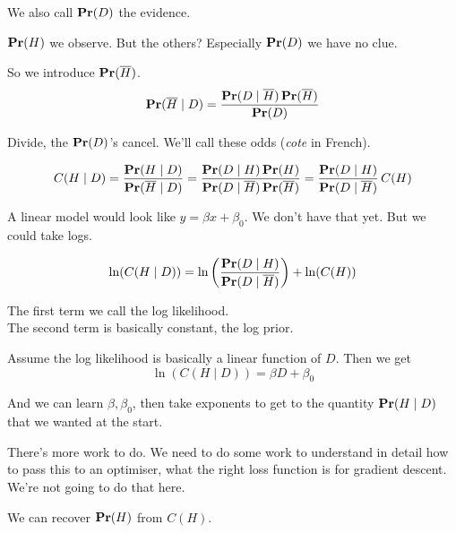 \begin{soln}
\begin{example}
    We also call $\mathbf{Pr}(D)$ the evidence.

    $\mathbf{Pr}(H)$ we observe.  But the others?  Especially $\mathbf{Pr}(D)$ we have
    no clue.

    So we introduce $\mathbf{Pr}(\overline{H})$.
    \begin{displaymath}
      \mathbf{Pr}(\overline{H}\mid D) = \frac{\mathbf{Pr}(D\mid \overline{H})\, \mathbf{Pr}(\overline{H})}{\mathbf{Pr}(D)}
    \end{displaymath}

    Divide, the $\mathbf{Pr}(D)$'s cancel.  We'll call these odds
    (\textit{cote} in French).

    \begin{displaymath}
      C(H\mid D) = \frac{\mathbf{Pr}(H\mid D)}{\mathbf{Pr}(\overline{H}\mid D)}
      = \frac{\mathbf{Pr}(D\mid H)\, \mathbf{Pr}(H)}{\mathbf{Pr}(D\mid \overline{H})\,
        \mathbf{Pr}(\overline{H})}
      = \frac{\mathbf{Pr}(D\mid H)}{\mathbf{Pr}(D\mid \overline{H})} \, C(H)
    \end{displaymath}

    A linear model would look like $y = \beta x + \beta_0$.  We don't
    have that yet.  But we could take logs.

    \begin{displaymath}
      \ln(C(H\mid D)) =
      \ln\left( \frac{\mathbf{Pr}(D\mid H)}{\mathbf{Pr}(D\mid \overline{H})} \right)
      + \ln(C(H))
    \end{displaymath}
  \end{example}

  The first term we call the log likelihood.\\
  The second term is basically constant, the log prior.

  Assume the log likelihood is basically a linear function of $D$.
  Then we get
  \begin{displaymath}
    \ln(C(H\mid D)) = \beta D + \beta_0
  \end{displaymath}

  And we can learn $\beta, \beta_0$, then take exponents to get to the
  quantity $\mathbf{Pr}(H\mid D)$ that we wanted at the start.
\end{soln}

\bigskip

There's more work to do.  We need to do some work to understand in
detail how to pass this to an optimiser, what the right loss function
is for gradient descent.  We're not going to do that here.

\begin{lemma}
  We can recover $\mathbf{Pr}(H)$ from $C(H)$.
\end{lemma}

